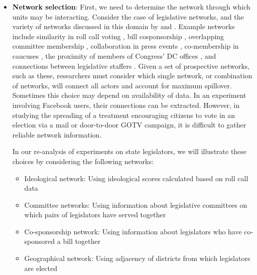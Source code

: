 \documentclass[12pt]{article}
\begin{document}
\begin{itemize}

\item \textbf{Network selection}:
First, we need to determine the network through which units may be interacting. Consider the case of legislative networks, and the variety of networks discussed in this domain by \citet{kirkland2014measurement} and \cite{desmarais2015measuring}. Example networks include similarity in roll call voting \citep{kim2012comparing}, bill cosponsorship \citep{fowler2006connecting}, overlapping committee membership \citep{porter2005network}, collaboration in press events \citep{desmarais2015measuring}, co-membership in caucuses \citep{victor2009social}, the proximity of members of Congress' DC offices \citep{rogowski2012estimating}, and connections between legislative staffers \citep{ringe2013keeping}. Given a set of prospective networks, such as these, researchers must consider which single network, or combination of networks, will connect all actors and account for maximum spillover. Sometimes this choice may depend on availability of data. In an experiment involving Facebook users, their connections can be extracted. However, in studying the spreading of a treatment encouraging citizens to vote in an election via a mail or door-to-door GOTV campaign, it is difficult to gather reliable network information.

In our re-analysis of experiments on state legislators, we will illustrate these choices by considering the following networks:
\begin{itemize}
\item Ideological network: Using ideological scores calculated based on roll call data
\item Committee networks: Using information about legislative committees on which pairs of legislators have served together
\item Co-sponsorship network: Using information about legislators who have co-sponsored a bill together
\item Geographical network: Using adjacency of districts from which legislators are elected
\end{itemize}



\end{itemize}
\end{document}

